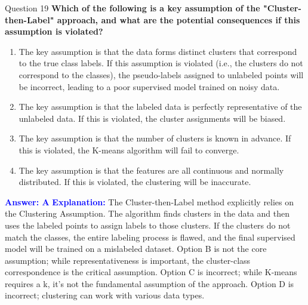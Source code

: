 \documentclass{beamer}
\begin{document}
	\begin{frame}{Question 19}
		\textbf{Which of the following is a key assumption of the "Cluster-then-Label" approach, and what are the potential consequences if this assumption is violated?}
		\begin{enumerate}
			\item The key assumption is that the data forms distinct clusters that correspond to the true class labels. If this assumption is violated (i.e., the clusters do not correspond to the classes), the pseudo-labels assigned to unlabeled points will be incorrect, leading to a poor supervised model trained on noisy data.
			\item The key assumption is that the labeled data is perfectly representative of the unlabeled data. If this is violated, the cluster assignments will be biased.
			\item The key assumption is that the number of clusters is known in advance. If this is violated, the K-means algorithm will fail to converge.
			\item The key assumption is that the features are all continuous and normally distributed. If this is violated, the clustering will be inaccurate.
		\end{enumerate}
		\vspace{0.2cm}
		\textcolor{blue}{\textbf{Answer: A}}
		\vspace{0.2cm}
		\textcolor{blue}{\textbf{Explanation:}} The Cluster-then-Label method explicitly relies on the Clustering Assumption. The algorithm finds clusters in the data and then uses the labeled points to assign labels to those clusters. If the clusters do not match the classes, the entire labeling process is flawed, and the final supervised model will be trained on a mislabeled dataset. Option B is not the core assumption; while representativeness is important, the cluster-class correspondence is the critical assumption. Option C is incorrect; while K-means requires a k, it's not the fundamental assumption of the approach. Option D is incorrect; clustering can work with various data types.
	\end{frame}
	
\end{document}
